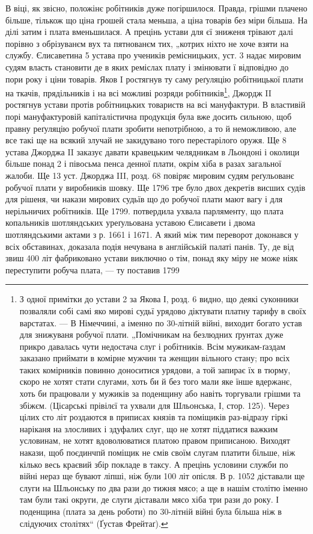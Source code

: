 В  віці, як звісно, положінє робітників дуже погіршилося.
Правда, грішми плачено більше, тількож що ціна
грошей стала меньша, а ціна товарів без міри більша. На
ділі затим і плата вменьшилася. А прецінь устави для єї
зниженя трівают далі порівно з обрізуванєм вух та пятнованєм
тих, „котрих ніхто не хоче взяти на службу. Єлисаветина
5 устава про учеників ремісницьких, уст. 3 надає
мировим судям власть становити де в яких реміслах плату
і змінювати ї відповідно до пори року і ціни товарів. Яков
I ростягнув ту саму реґуляцію робітницької плати на ткачів,
прядільників і на всі можливі розряди робітників\footnote{
З одної примітки до устави 2 за Якова І, розд. 6 видно, що
деякі суконники позваляли собі самі яко мирові судьї урядово діктувати
платну тарифу в своїх варстатах. — В Німеччині, а іменно по 30-літній
війні, виходит богато устав для знижуваня робучої плати. „Помічникам
на безлюдних ґрунтах дуже прикро давалась чути недостача слуг і робітників.
Всім мужикам-ґаздам заказано приймати в комірне мужчин та
женщин вільного стану; про всіх таких комірників повинно доноситися
урядови, а той запирає їх в тюрму, скоро не хотят стати слугами, хоть би
й без того мали яке їнше вдержанє, хоть би працювали у  мужиків за поденщину
або навіть торгували грішми та збіжєм. (Цісарські прівілєї та
ухвали для Шльонська, І, стор. 125). Через цілих сто літ роздаются в приписах
князів та поміщиків раз-відразу гіркі наріканя на злосливих
і здуфалих слуг, що не хотят піддатися важким условинам, не хотят вдоволюватися
платою правом приписаною. Виходят накази, щоб поєдинчпй
поміщик не смів своїм слугам платити більше, ніж кілько весь краєвий
збір покладе в таксу. А прецінь условини служби по війні нераз ще
бувают ліпші, ніж були 100 літ опісля. В р. 1052 діставали ще слуги на
Шльонську по два рази до тижня мясо; а ще в нашім столітю іменно
там були такі округи, де слуги діставали мясо хіба три рази до року.
І поденщина (плата за день роботи) по 30-літній війні була більша ніж
в слідуючих столітях“ (Ґустав Фрейтаґ).
}, Джордж
II ростягнув устави протів робітницьких товариств на всі
мануфактури. В властивій порі мануфактуровій капіталістична
продукція була вже досить сильною, щоб правну
реґуляцію робучої плати зробити непотрібною, а то й неможливою,
але все такі ще на всякий злучай не закидувано
того перестарілого оружя. Ще 8 устава Джорджа II заказує
давати кравецьким челядникам в Льондоні і околици більше
понад 2 і півосьма пенса денної плати, окрім хіба
в разах загальної жалоби. Ще 13 уст. Джорджа III, розд.
68 повіряє мировим судям реґульованє робучої плати у виробників
шовку. Ще 1796 тре було двох декретів висших
судів для рішеня, чи накази мирових судьїв що до робучої
плати мают вагу і для нерільничих робітників. Ще 1799.
потвердила ухвала парляменту, що плата копальників шотляндських
уреґульована уставою Єлисавети і двома шотляндськими
актами з р. 1661 і 1671. А який між тим переворот
доконався у всіх обставинах, доказала подія нечувана
в англійській палаті панів. Ту, де від звиш 400 літ
фабриковано устави виключно о тім, понад яку міру не
може ніяк переступити робуча плата, — ту поставив 1799
\parbreak{}
